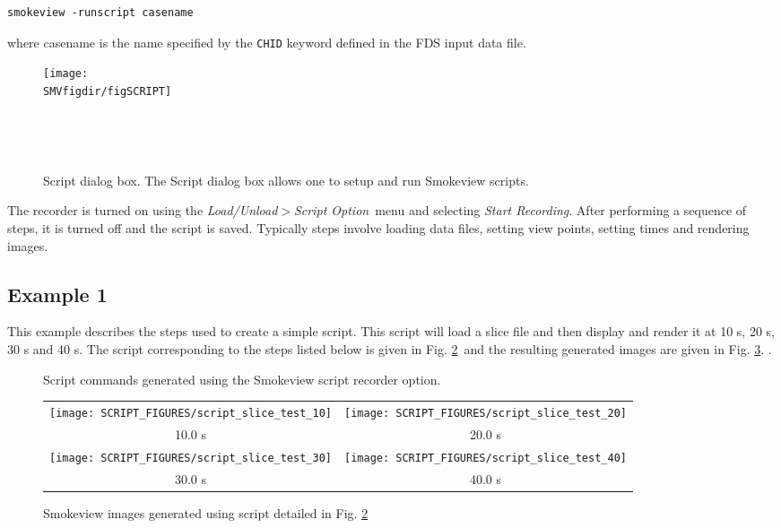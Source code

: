 \documentclass[11pt,twoside]{book}
\begin{document}
\begin{lstlisting}
smokeview -runscript casename
\end{lstlisting}

\noindent where casename is the name specified by the {\tt CHID}
keyword defined in the FDS input data file.

\begin{figure}[bph]
\centerline{
\texttt{[image: \\SMVfigdir/figSCRIPT]}
}\ \caption[Script dialog box.]{Script dialog box.
The Script dialog box allows one to setup and run Smokeview
scripts. }\ \label{figSCRIPT}
\end{figure}

The recorder is turned on using the
{\em Load/Unload$>$Script Option}\ menu and selecting {\em Start Recording}.
After performing a sequence of steps, it is turned off and the
script is saved. Typically steps involve loading data files,
setting view points, setting times and rendering images.

\subsection{Example 1}

This example describes the steps used to create a simple script.  This script
will load a slice file and then display and render it at 10 s, 20 s, 30 s and 40 s.
The script corresponding to the steps listed below is given
in Fig. \ref{figsimplescripttext}\ and the resulting generated images are given
in Fig. \ref{figsimplescriptimages}.
.
\begin{figure}[bph]
\caption{Script commands generated using the Smokeview script recorder option.}
\label{figsimplescripttext}%
\end{figure}

\begin{figure}[bph]
\begin{center}
\begin{tabular}{cc}
\texttt{[image: SCRIPT\_FIGURES/script\_slice\_test\_10]}&
\texttt{[image: SCRIPT\_FIGURES/script\_slice\_test\_20]}\\
10.0 s&20.0 s\\
\texttt{[image: SCRIPT\_FIGURES/script\_slice\_test\_30]}&
\texttt{[image: SCRIPT\_FIGURES/script\_slice\_test\_40]}\\
30.0 s&40.0 s\\
\end{tabular}
\end{center}
\caption{Smokeview images generated using script detailed in
 Fig. \ref{figsimplescripttext}}
\label{figsimplescriptimages}%
\end{figure}
\end{document}
